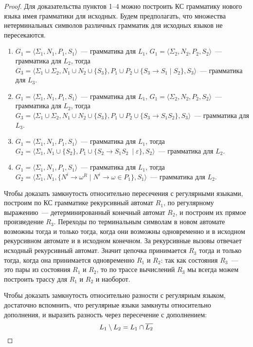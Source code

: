 \begin{proof}
    Для доказательства пунктов 1--4 можно построить КС грамматику нового языка имея грамматики для исходных.
    Будем предполагать, что множества нетерминальных символов различных грамматик для исходных языков не пересекаются.
    \begin{enumerate}
        \item $G_1=\langle\Sigma_1,N_1,P_1,S_1\rangle$~--- грамматика для $L_1$, $G_1=\langle\Sigma_2,N_2,P_2,S_2\rangle$~--- грамматика для $L_2$, тогда $G_3=\langle\Sigma_1 \cup \Sigma_2, N_1 \cup N_2 \cup \{S_3\}, P_1 \cup P_2 \cup \{S_3 \to S_1 \mid S_2\} ,S_3\rangle$~--- грамматика для $L_3$.
        \item $G_1=\langle\Sigma_1,N_1,P_1,S_1\rangle$~--- грамматика для $L_1$, $G_1=\langle\Sigma_2,N_2,P_2,S_2\rangle$~--- грамматика для $L_2$, тогда $G_3=\langle\Sigma_1 \cup \Sigma_2, N_1 \cup N_2 \cup \{S_3\}, P_1 \cup P_2 \cup \{S_3 \to S_1 S_2\} ,S_3\rangle$~--- грамматика для $L_3$.
        \item $G_1=\langle\Sigma_1,N_1,P_1,S_1\rangle$~--- грамматика для $L_1$, тогда $G_2=\langle\Sigma_1, N_1 \cup \{S_2\}, P_1 \cup \{S_2 \to S_1 S_2\ \mid \varepsilon\}, S_2\rangle$~--- грамматика для $L_2$.
        \item $G_1=\langle\Sigma_1,N_1,P_1,S_1\rangle$~--- грамматика для $L_1$, тогда $G_2=\langle\Sigma_1, N_1, \{N^i \to \omega^R \mid N^i \to \omega \in P_1 \}, S_1\rangle$~--- грамматика для $L_2$.
    \end{enumerate}

    Чтобы доказать замкнутость относительно пересечения с регулярными языками, построим по КС грамматике рекурсивный автомат $R_1$, по регулярному выражению~--- детерминированный конечный автомат $R_2$, и построим их прямое произведение $R_3$.
    Переходы по терминальным символам в новом автомате возможны тогда и только тогда, когда они возможны одновременно и в исходном рекурсивном автомате и в исходном конечном.
    За рекурсивные вызовы отвечает исходный рекурсивный автомат.
    Значит цепочка принимается $R_3$ тогда и только тогда, когда она принимается одновременно $R_1$ и $R_2$: так как состояния $R_3$~--- это пары из состояния $R_1$ и $R_2$, то по трассе вычислений $R_3$ мы всегда можем построить трассу для $R_1$ и $R_2$ и наоборот.

    Чтобы доказать замкнутость относительно разности с регулярным языком, достаточно вспомнить, что регулярные языки замкнуты относительно дополнения, и выразить разность через пересечение с дополнением:
    \[L_1 \setminus L_2 = L_1 \cap \overline{L_2} \qedhere\]
\end{proof}

